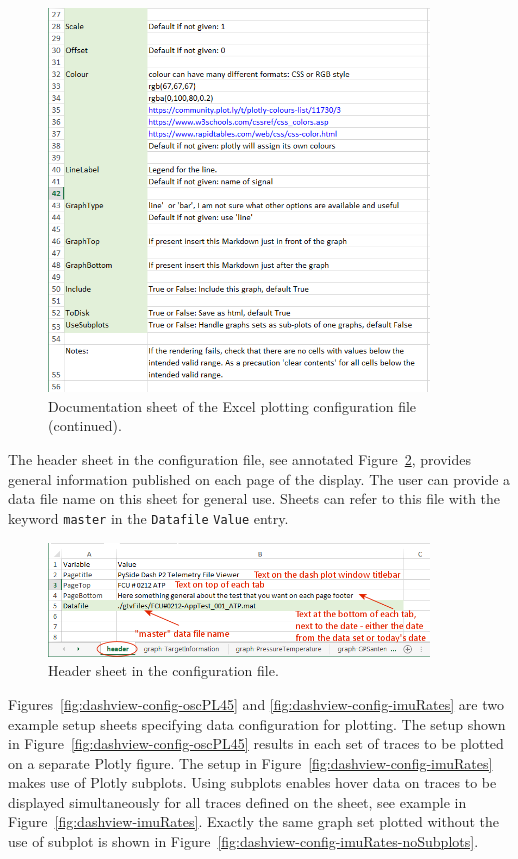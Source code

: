 \begin{figure}[h]
\centering
\includegraphics[width=0.90\textwidth]{pic/dashview-config2}
\caption{Documentation sheet of the Excel plotting configuration file (continued).
\label{fig:dashviewConfig2}}
\end{figure}

The header sheet in the configuration file, see annotated Figure~\ref{fig:dashview-config-header}, provides general information published on each page of the display. The user can provide a data file name on this sheet for general use. Sheets can refer to this file with the keyword \texttt{master} in the \texttt{Datafile} \texttt{Value} entry.

\begin{figure}[h]
\centering
\includegraphics[width=0.90\textwidth]{pic/dashview-config-header}
\caption{Header sheet in the configuration file.
\label{fig:dashview-config-header}}
\end{figure}

Figures~\ref{fig:dashview-config-oscPL45} and \ref{fig:dashview-config-imuRates} are two example setup sheets specifying data configuration for plotting. The setup shown in Figure~\ref{fig:dashview-config-oscPL45} results in each set of traces to be plotted on a separate Plotly figure. The setup in Figure~\ref{fig:dashview-config-imuRates} makes use of Plotly subplots. Using subplots enables hover data on traces to be displayed simultaneously for all traces defined on the sheet, see example in Figure~\ref{fig:dashview-imuRates}. Exactly the same graph set plotted without the use of subplot is shown in Figure~\ref{fig:dashview-config-imuRates-noSubplots}.

